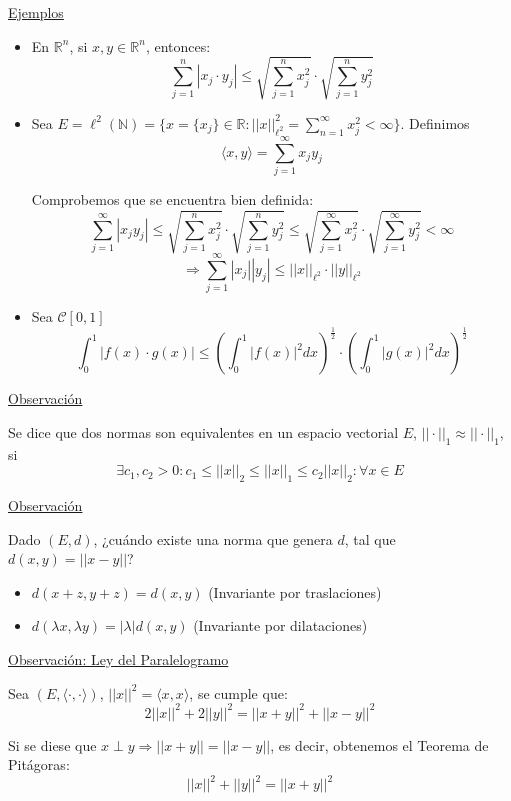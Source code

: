 \documentclass[10pt,a4paper,openright]{book}
\theoremstyle{break}
\begin{document}
\underline{Ejemplos}
\begin{itemize}
\item En $\mathbb{R}^n$, si $x,y \in \mathbb{R}^n$, entonces:
$$\sum_{j=1}^{n} |x_j \cdot y_j | \leq \sqrt{\sum_{j=1}^{n} x_j^2} \cdot\sqrt{\sum_{j=1}^{n} y_j^2} $$

\item Sea $E = \ell^2 (\mathbb{N}) = \{x= \{x_j\} \in \mathbb{R} : ||x||^2_{\ell^2} = \sum_{n=1}^{\infty} x_j^2 < \infty\}$. Definimos 
$$\langle x,y \rangle = \sum_{j=1}^{\infty} x_j y_j$$

Comprobemos que se encuentra bien definida:
$$\sum_{j=1}^{\infty} |x_j y_j | \leq \sqrt{\sum_{j=1}^{n} x_j^2} \cdot\sqrt{\sum_{j=1}^{n} y_j^2} \leq \sqrt{\sum_{j=1}^{\infty} x_j^2} \cdot\sqrt{\sum_{j=1}^{\infty} y_j^2}  < \infty $$
$$\Rightarrow\sum_{j=1}^{\infty} |x_j|| y_j | \leq ||x||_{\ell^2} \cdot ||y||_{\ell^2}$$

\item Sea $\mathcal{C}[0,1]$
$$\int_{0}^{1} |f(x) \cdot g(x)| \leq \left( \int_{0}^{1} |f(x)|^2 dx \right)^\frac{1}{2} \cdot \left( \int_{0}^{1} |g(x)|^2 dx \right)^\frac{1}{2} $$
\end{itemize}

\underline{Observación}

Se dice que dos normas son equivalentes en un espacio vectorial $E$, $|| \cdot ||_1 \approx || \cdot ||_1$, si 
$$\exists c_1,c_2 > 0 : c_1 \leq ||x||_2 \leq ||x||_1 \leq c_2 ||x||_2 : \forall x \in E$$

\underline{Observación}

Dado $(E,d)$, ¿cuándo existe una norma que genera $d$, tal que $d(x,y) = ||x-y||$?

\begin{itemize}
\item $d(x+z,y+z) = d(x,y)$ (Invariante por traslaciones)

\item $d(\lambda x, \lambda y) = |\lambda | d(x,y)$ (Invariante por dilataciones)
\end{itemize}

\underline{Observación: Ley del Paralelogramo}

Sea $(E, \langle \cdot , \cdot \rangle)$, $||x||^2 = \langle x,x\rangle$, se cumple que:
$$2||x||^2 + 2||y||^2 = ||x+y||^2 + ||x-y||^2$$

Si se diese que $x \perp y \Rightarrow ||x+y|| = ||x-y||$, es decir, obtenemos el Teorema de Pitágoras:
$$||x||^2 + ||y||^2 = ||x+y||^2$$
\end{document}
